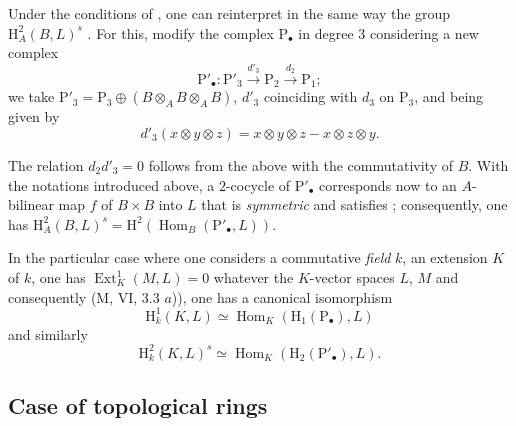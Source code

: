 \begin{env}[18.4.5]
\label{0.18.4.5}
Under the conditions of , one can reinterpret in the same way the group $\mathrm{H}^2_A(B,L)^s$ .
For this, modify the complex $\mathrm{P}_\bullet$ in degree $3$ considering a new complex
\[
  \mathrm{P}'_\bullet:\mathrm{P}'_3\xrightarrow{d'_3}\mathrm{P}_2\xrightarrow{d_2}\mathrm{P}_1;
\]
we take $\mathrm{P}'_3=\mathrm{P}_3\oplus(B\otimes_A B\otimes_A B)$, $d'_3$ coinciding with $d_3$ on $\mathrm{P}_3$, and being given by
\[
  d'_3(x\otimes y\otimes z)=x\otimes y\otimes z-x\otimes z\otimes y.
\]

The relation $d_2 d'_3=0$ follows from the above with the commutativity of $B$.
With the notations introduced above, a $2$-cocycle of $\mathrm{P}'_\bullet$ corresponds now to an $A$-bilinear map $f$ of $B\times B$ into $L$ that is \emph{symmetric} and satisfies ; consequently, one has $\mathrm{H}^2_A(B,L)^s=\mathrm{H}^2(\operatorname{Hom}_B(\mathrm{P}'_\bullet,L))$.
\end{env}

\begin{env}[18.4.6]
\label{0.18.4.6}
In the particular case where one considers a commutative \emph{field} $k$, an extension $K$ of $k$, one has $\operatorname{Ext}^1_K(M,L)=0$ whatever the $K$-vector spaces $L$, $M$ and consequently (M, VI, 3.3 $a$)), one has a canonical isomorphism
\begin{equation}
\tag{18.4.6.1}
  \label{0.18.4.6.1}
  \mathrm{H}^1_k(K,L)\simeq\operatorname{Hom}_K(\mathrm{H}_1(\mathrm{P}_\bullet),L)
\end{equation}
and similarly
\begin{equation}
\tag{18.4.6.2}
  \label{0.18.4.6.2}
  \mathrm{H}^2_k(K,L)^s\simeq\operatorname{Hom}_K(\mathrm{H}_2(\mathrm{P}'_\bullet),L).
\end{equation}
\end{env}

\subsection{Case of topological rings}
\label{subsection:0.18.5}

